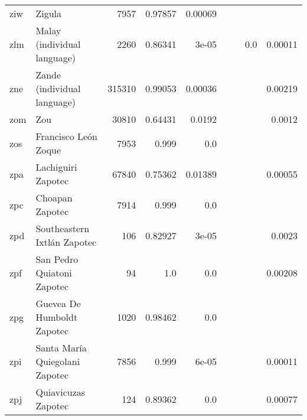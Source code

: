 \documentclass[11pt]{article}
\begin{document}
\begin{table*}[h]
{\begin{tabular}{llrrrrrrr}
ziw         & Zigula         & 7957         & 0.97857         & 0.00069         &          &          &          &          \\

zlm         & Malay (individual language)         & 2260         & 0.86341         & 3e-05         &          &          & 0.0         & 0.00011         \\

zne         & Zande (individual language)         & 315310         & 0.99053         & 0.00036         &          &          &          & 0.00219         \\

zom         & Zou         & 30810         & 0.64431         & 0.0192         &          &          &          & 0.0012         \\

zos         & Francisco León Zoque         & 7953         & 0.999         & 0.0         &          &          &          &          \\

zpa         & Lachiguiri Zapotec         & 67840         & 0.75362         & 0.01389         &          &          &          & 0.00055         \\

zpc         & Choapan Zapotec         & 7914         & 0.999         & 0.0         &          &          &          &          \\

zpd         & Southeastern Ixtlán Zapotec         & 106         & 0.82927         & 3e-05         &          &          &          & 0.0023         \\

zpf         & San Pedro Quiatoni Zapotec         & 94         & 1.0         & 0.0         &          &          &          & 0.00208         \\

zpg         & Guevea De Humboldt Zapotec         & 1020         & 0.98462         & 0.0         &          &          &          &          \\

zpi         & Santa María Quiegolani Zapotec         & 7856         & 0.999         & 6e-05         &          &          &          & 0.00011         \\

zpj         & Quiavicuzas Zapotec         & 124         & 0.89362         & 0.0         &          &          &          & 0.00077         \\


\end{tabular}}
\end{table*}
\end{document}
